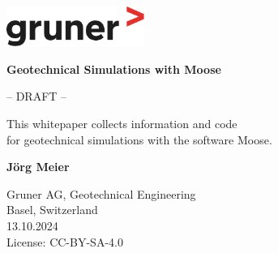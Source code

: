 \begin{titlepage}
    \begin{flushright}
        \includegraphics[width=4.5cm]{img/gruner.pdf}
    \end{flushright}
    \begin{center}
        \vspace*{5cm}

        {\Huge\textbf{Geotechnical Simulations with Moose}}

        \vspace{5cm}

        \large{-- DRAFT --}

        \vfill

        \large{This whitepaper collects information and code \\
            for geotechnical simulations with the software Moose.}

        \vfill

        \textbf{Jörg Meier}

        \vspace{0.8cm}

        Gruner AG, Geotechnical Engineering\\
        Basel, Switzerland\\

        \vspace{1cm}
        13.10.2024\\

        \vspace{1cm}
        License: CC-BY-SA-4.0

    \end{center}
\end{titlepage}